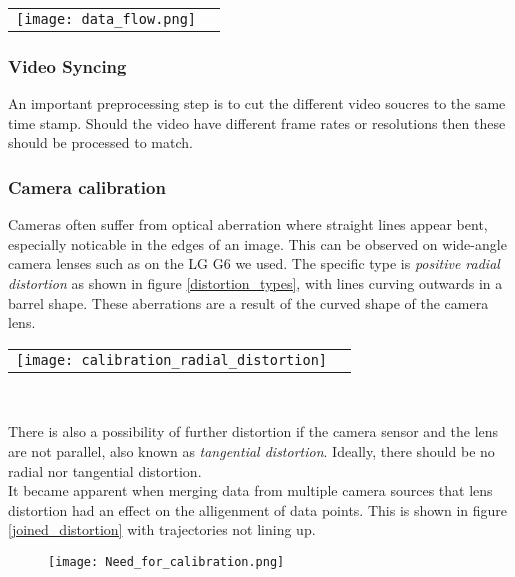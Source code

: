 \color{red}
\raggedbottom
\begin{tabular}{@{}cc}
\texttt{[image: data\_flow.png]} 
\end{tabular}
\label{data}
\raggedbottom
\color{black}

\subsubsection{Video Syncing}
An important preprocessing step is to cut the different video soucres to the same time stamp.
Should the video have different frame rates or resolutions then these should be processed to match.

\subsubsection{Camera calibration}
Cameras often suffer from optical aberration where straight lines appear bent, especially noticable in the edges of an image. 
This can be observed on wide-angle camera lenses such as on the LG G6 we used.
The specific type is \textit{positive radial distortion} as shown in figure \ref{distortion_types}, with lines curving outwards in a barrel shape.
These aberrations are a result of the curved shape of the camera lens.
\ \\ 

\raggedbottom
\begin{tabular}{@{}cc}
\texttt{[image: calibration\_radial\_distortion]} 
\end{tabular}
\label{distortion_types}
\

There is also a possibility of further distortion if the camera sensor and the lens are not parallel, also known as \textit{tangential distortion}.
Ideally, there should be no radial nor tangential distortion.
\ \\
It became apparent when merging data from multiple camera sources that lens distortion had an effect on the alligenment of data points.
This is shown in figure \ref{joined_distortion} with trajectories not lining up.

\begin{figure}[h]
  \texttt{[image: Need\_for\_calibration.png]}
  \centering 
  \end{figure}
  \label{joined_distortion}
\ \\

